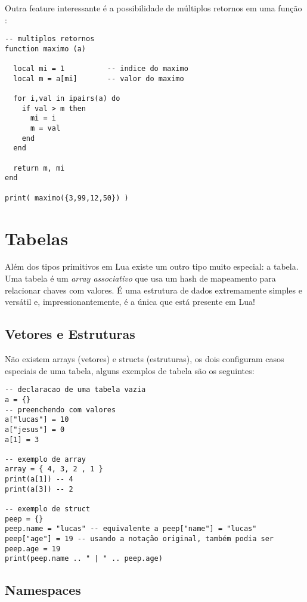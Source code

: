 \documentclass[a4paper,12pt]{abnt}
\begin{document}
Outra feature interessante é a possibilidade de
múltiplos retornos em uma função \cite{pil} :

\begin{lstlisting}
-- multiplos retornos
function maximo (a)

  local mi = 1          -- indice do maximo
  local m = a[mi]       -- valor do maximo

  for i,val in ipairs(a) do
    if val > m then
      mi = i
      m = val
    end
  end

  return m, mi
end

print( maximo({3,99,12,50}) )

\end{lstlisting}

\section{Tabelas}

Além dos tipos primitivos em Lua existe um outro tipo muito especial: a tabela.
Uma tabela é um \emph{array associativo} que usa um hash de mapeamento \cite{pil}
para relacionar chaves com valores.
É uma estrutura de dados extremamente simples e versátil e,
impressionantemente, é a única que está presente em Lua!

\subsection{Vetores e Estruturas}

Não existem arrays (vetores) e structs (estruturas), os dois configuram
casos especiais de uma tabela,
alguns exemplos de tabela são os seguintes:

\begin{lstlisting}
-- declaracao de uma tabela vazia
a = {}
-- preenchendo com valores
a["lucas"] = 10
a["jesus"] = 0
a[1] = 3

-- exemplo de array
array = { 4, 3, 2 , 1 }
print(a[1]) -- 4
print(a[3]) -- 2

-- exemplo de struct
peep = {}
peep.name = "lucas" -- equivalente a peep["name"] = "lucas"
peep["age"] = 19 -- usando a notação original, também podia ser peep.age = 19
print(peep.name .. " | " .. peep.age)
\end{lstlisting}

\subsection{Namespaces}
\end{document}
